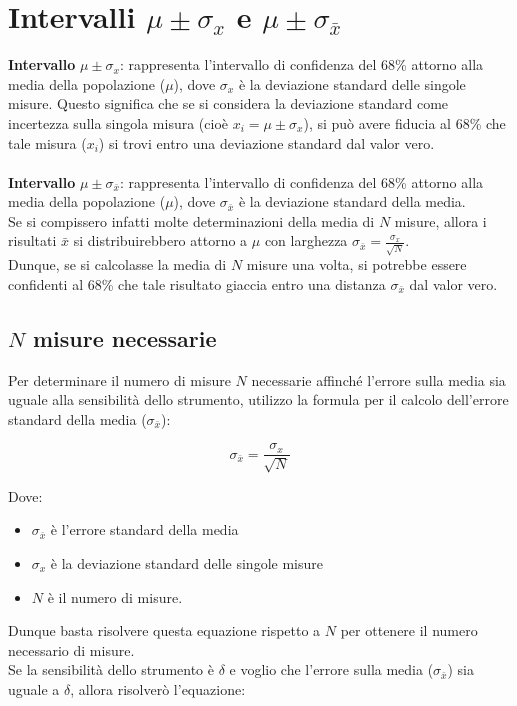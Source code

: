 \documentclass{article}
\begin{document}
\section{Intervalli $\mu \pm \sigma_x$ e $\mu \pm \sigma_{\bar{x}}$} 
\textbf{Intervallo} $\mu \pm \sigma_x$: rappresenta l'intervallo di confidenza del 68\% attorno alla media della popolazione ($\mu$), dove $\sigma_x$ è la deviazione standard delle singole misure. Questo significa che se si considera la deviazione standard come incertezza sulla singola misura (cioè $x_i = \mu \pm \sigma_x$), si può avere fiducia al 68\% che tale misura ($x_i$) si trovi entro una deviazione standard dal valor vero.
\\\\ \noindent\textbf{Intervallo} $\mu \pm \sigma_{\bar{x}}$: rappresenta l'intervallo di confidenza del 68\% attorno alla media della popolazione ($\mu$), dove $\sigma_{\bar{x}}$ è la deviazione standard della media.
\\Se si compissero infatti molte determinazioni della media di $N$ misure, allora i risultati $\bar{x}$ si distribuirebbero attorno a $\mu$ con larghezza $\sigma_{\bar{x}} =  \frac{\sigma_x}{\sqrt{N}} $.
\\ Dunque, se si calcolasse la media di $N$ misure una volta, si potrebbe essere confidenti al 68\% che tale risultato giaccia entro una distanza $ \sigma_{\bar{x}}$ dal valor vero.

\subsection{$N$ misure necessarie}
Per determinare il numero di misure $N$ necessarie affinché l'errore sulla media sia uguale alla sensibilità dello strumento, utilizzo la formula per il calcolo dell'errore standard della media ($\sigma_{\bar{x}}$):

\[\sigma_{\bar{x}} = \frac{\sigma_x}{\sqrt{N}}\]

\noindent Dove:
\begin{itemize}
  \item $\sigma_{\bar{x}}$ è l'errore standard della media
  \item $\sigma_x$ è la deviazione standard delle singole misure
  \item $N$ è il numero di misure.
\end{itemize}

\noindent Dunque basta risolvere questa equazione rispetto a $N$ per ottenere il numero necessario di misure. \\Se la sensibilità dello strumento è $\delta$ e voglio che l'errore sulla media ($\sigma_{\bar{x}}$) sia uguale a $\delta$, allora risolverò l'equazione:
\end{document}
